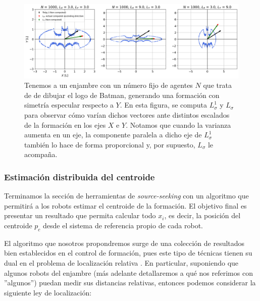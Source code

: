 \vspace{0.8cm}

\begin{figure}[!h]
\centering
\includegraphics[trim={0cm 0.0cm 0cm 0.0cm}, clip, width=1\columnwidth]{./fig/batman.png}
\caption{Tenemos a un enjambre con un número fijo de agentes $N$ que trata de de dibujar el logo de Batman, generando una formación con simetría especular respecto a $Y$. En esta figura, se computa $L_\sigma^1$ y $L_\sigma$ para observar cómo varían dichos vectores ante distintos escalados de la formación en los ejes $X$ e $Y$. Notamos que cuando la varianza aumenta en un eje, la componente paralela a dicho eje de $L_\sigma^1$ también lo hace de forma proporcional y, por supuesto, $L_\sigma$ le acompaña.}
\label{fig: batman}
\end{figure}

\vspace{0.2cm}


\subsubsection{Estimación distribuida del centroide}

Terminamos la sección de herramientas de \textit{source-seeking} con un algoritmo que permitirá a los robots estimar el centroide de la formación. El objetivo final es presentar un resultado que permita calcular todo $x_i$, es decir, la posición del centroide $p_c$ desde el sistema de referencia propio de cada robot.

El algoritmo que nosotros propondremos surge de una colección de resultados bien establecidos en el control de formación, pues este tipo de técnicas tienen su dual en el problema de localización relativa \cite{oh2015survey}. En particular, suponiendo que algunos robots del enjambre (más adelante detallaremos a qué nos referimos con ''algunos'') puedan medir sus distancias relativas, entonces podemos considerar la siguiente ley de localización:


